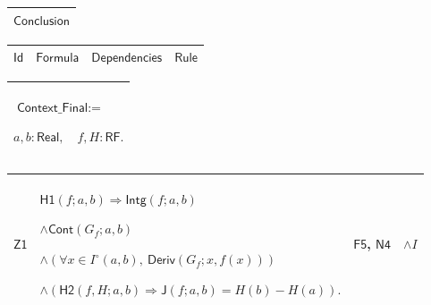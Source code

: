 \documentclass[11pt]{amsart}
\renewcommand{\arraystretch}{1.4}
\newlength{\FTCOneColumnBody}
\newlength{\FTCFourColumnBody}
\begin{document}
{\centering
\renewcommand{\arraystretch}{1.4}
\par\setlength{\parskip}{0pt}\nointerlineskip
\noindent
\begin{tabular}{|@{}>{\centering\arraybackslash}m{\FTCOneColumnBody}|}\hline
$\displaystyle \textsf{Conclusion}$\\ \hline
\end{tabular}%
\par\setlength{\parskip}{0pt}\nointerlineskip
\noindent
\begin{tabular}{|@{}>{\centering\arraybackslash}m{0.078431\FTCFourColumnBody}|>{\centering\arraybackslash}m{0.535947\FTCFourColumnBody}|>{\centering\arraybackslash}m{0.281045\FTCFourColumnBody}|>{\centering\arraybackslash}m{0.104575\FTCFourColumnBody}|}\hline
$\displaystyle \textsf{Id}$ & $\displaystyle \textsf{Formula}$ & $\displaystyle \textsf{Dependencies}$ & $\displaystyle \textsf{Rule}$\\ \hline
\end{tabular}%
\par\setlength{\parskip}{0pt}\nointerlineskip
\noindent
\begin{tabular}{|@{}>{\centering\arraybackslash}m{\FTCOneColumnBody}|}\hline
$\displaystyle \textsf{Context\_Final}:=$\par
$\displaystyle a,b:\textsf{Real},\quad f,H:\textsf{RF}.$\\ \hline
\end{tabular}%
\par\setlength{\parskip}{0pt}\nointerlineskip
\noindent
\begin{tabular}{|@{}>{\centering\arraybackslash}m{0.078431\FTCFourColumnBody}|>{\centering\arraybackslash}m{0.535947\FTCFourColumnBody}|>{\centering\arraybackslash}m{0.281045\FTCFourColumnBody}|>{\centering\arraybackslash}m{0.104575\FTCFourColumnBody}|}\hline
\hypertarget{proof:Z1}{$\displaystyle \textsf{Z1}$} & $\displaystyle \textsf{H1}(f;a,b)\Rightarrow\textsf{Intg}(f;a,b)$\par
$\displaystyle \land\textsf{Cont}(G_f;a,b)$\par
$\displaystyle \land(\forall x\in I^\circ(a,b),\ \textsf{Deriv}(G_f;x,f(x)))$\par
$\displaystyle \land(\textsf{H2}(f,H;a,b)\Rightarrow\textsf{J}(f;a,b)=H(b)-H(a)).$ & \hyperlink{proof:F5}{$\displaystyle \textsf{F5}$}, \hyperlink{proof:N4}{$\displaystyle \textsf{N4}$} & $\displaystyle \land I$\\ \hline
\end{tabular}%
\par
}
\end{document}
